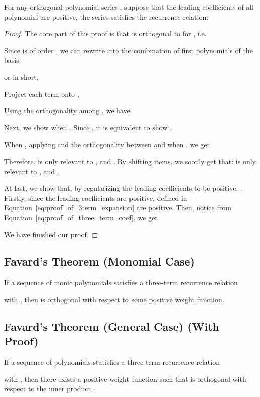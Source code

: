 \begin{theorem}\citep[p.~12]{simon54orthogonal}
  For any orthogonal polynomial series , 
  suppose that the leading coefficients of all polynomial are positive, 
  the series satisfies the recurrence relation: 
 
\label{thm:3term}
\end{theorem}






\begin{proof}
  The core part of this proof is that  is orthogonal to  for , i.e.
  
  Since  is of order , we can rewrite  into the
  combination of first  polynomials of the basis:
  
   
  or in short,
  
  Project each term onto ,
  

  Using the orthogonality among , 
  we have

   

  Next, we show  when .
  Since , it is equivalent to show .
  
  When , applying  and the orthogonality between  and  when , we get
  
  Therefore, { is only relevant to ,  and }. By shifting items, we soonly get that:
  { is only relevant to , 
  and }. 
  


  At last, we show that, 
  by regularizing the leading coefficients  to be positive, . 
  Firstly, since the leading coefficients are positive, 
   defined in Equation~\eqref{eq:proof_of_3term_expansion} 
  are positive.
  Then, notice from Equation~\eqref{eq:proof_of_three_term_coef}, 
  we get 
  
  
  We have finished our proof.
\end{proof}
 \subsection{Favard's Theorem (Monomial Case)}
\label{sec:favard-monomial}
\begin{theorem}\cite{favard1935polynomes}
  If a sequence of monic polynomials  satisfies a
  three-term recurrence relation

with , 
then  is orthogonal with respect to some 
positive weight function.
\label{thm:favard-monic}
\end{theorem} \subsection{Favard's Theorem (General Case) (With Proof)}
\label{sec:proof-of-far}
\begin{corollary}
   If a sequence of polynomials  statisfies a three-term recurrence
   relation
   
   with , then there exists a positive weight function 
    such that  is orthogonal with
   respect to the inner product .   
\end{corollary}



